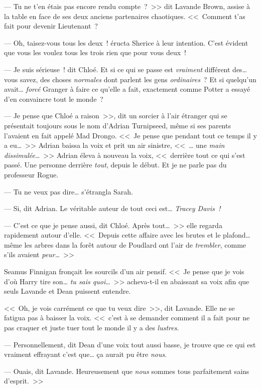 --- Tu ne t'en étais pas encore rendu compte~?~>> dit Lavande Brown, assise à la table en face de ses deux anciens partenaires chaotiques. <<~Comment t'as fait pour devenir Lieutenant~?

--- Oh, taisez-vous tous les deux~! éructa Sherice à leur intention. C'est évident que vous les voulez tous les trois rien que pour vous deux~!

--- Je suis sérieuse~! dit Chloé. Et si ce qui se passe est \emph{vraiment} différent des… vous savez, des choses \emph{normales} dont parlent les gens \emph{ordinaires}~? Et si quelqu'un avait… \emph{forcé} Granger à faire ce qu'elle a fait, exactement comme Potter a essayé d'en convaincre tout le monde~?

--- Je pense que Chloé a raison~>>, dit un sorcier à l'air étranger qui se présentait toujours sous le nom d'Adrian Turnipseed, même si ses parents l'avaient en fait appelé Mad Drongo. <<~Je pense que pendant tout ce temps il y a eu…~>> Adrian baissa la voix et prit un air sinistre, <<~… une \emph{main dissimulée}…~>> Adrian éleva à nouveau la voix, <<~derrière tout ce qui s'est passé. Une personne derrière \emph{tout}, depuis le début. Et je ne parle pas du professeur Rogue.

--- Tu ne veux pas dire… s'étrangla Sarah.

--- Si, dit Adrian. Le véritable auteur de tout ceci est… \emph{Tracey Davis~!}

--- C'est ce que je pense aussi, dit Chloé. Après tout…~>> elle regarda rapidement autour d'elle. <<~Depuis cette affaire avec les brutes et le plafond… même les arbres dans la forêt autour de Poudlard ont l'air de \emph{trembler}, comme s'ils avaient \emph{peur…}~>>

Seamus Finnigan fronçait les sourcils d'un air pensif. <<~Je pense que je vois d'où Harry tire son… \emph{tu sais quoi}…~>> acheva-t-il en abaissant sa voix afin que seuls Lavande et Dean puissent entendre.

<<~Oh, je vois carrément ce que tu veux dire~>>, dit Lavande. Elle ne se fatigua pas à baisser la voix. <<~c'est à se demander comment il a fait pour ne pas craquer et juste tuer tout le monde il y a des \emph{lustres}.

--- Personnellement, dit Dean d'une voix tout aussi basse, je trouve que ce qui est vraiment effrayant c'est que… ça aurait pu être \emph{nous}.

--- Ouais, dit Lavande. Heureusement que \emph{nous} sommes tous parfaitement sains d'esprit.~>>

